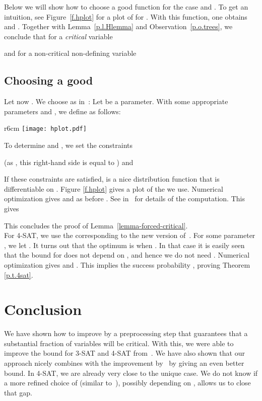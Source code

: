 Below we will show how to choose a good function  for the case
 and . To get an intuition, see Figure~\ref{f.hplot} for a
plot of  for . With this function, one obtains  and .
Together with Lemma~\ref{p.l.Hlemma} and Observation~\ref{p.o.trees},
we conclude that for a {\em critical} variable 

and for a non-critical non-defining variable 


\subsection{Choosing a good }

Let now . We choose  as in~\cite{rolf2006}: Let  be a parameter. With some appropriate parameters  and , we define  as follows:

\begin{wrapfigure}{r}{6cm}
\texttt{[image: hplot.pdf]}
\caption{ for 3-SAT}
\label{f.hplot}
\end{wrapfigure}
To determine  and , we set the constraints 
 
(as , this right-hand side is equal to ) and 



If these constraints are satisfied,  is a nice distribution function that is differentiable on . Figure \ref{f.hplot} gives a plot of the  we use. Numerical optimization gives  and as before . See  in~\cite{thesis} for details of the computation.
This gives




This concludes the proof of Lemma~\ref{lemma-forced-critical}.\\

For 4-SAT, we use the  corresponding to the new version of~\cite{ppsz}. For some parameter , we let .
It turns out that the optimum is when . In that case it is easily seen that the bound for \PPSZ{} does not depend on , and hence we do not need \Schoening{}.
Numerical optimization gives  and . This implies the success probability , proving Theorem \ref{p.t.4sat}.

\section{Conclusion}
We have shown how to improve \PPSZ{} by a preprocessing step that
guarantees that a substantial fraction of variables will be critical. With this,
we were able to improve the bound for 3-SAT and 4-SAT
from~\cite{rolf2006}. We have also shown that our approach nicely
combines with the improvement by~\cite{istt10} by giving an even
better bound. In 4-SAT, we are
already very close to the unique case. We do not know if a more
refined choice of  (similar to~\cite{rolf2006}), possibly depending
on , allows us to close that gap.

